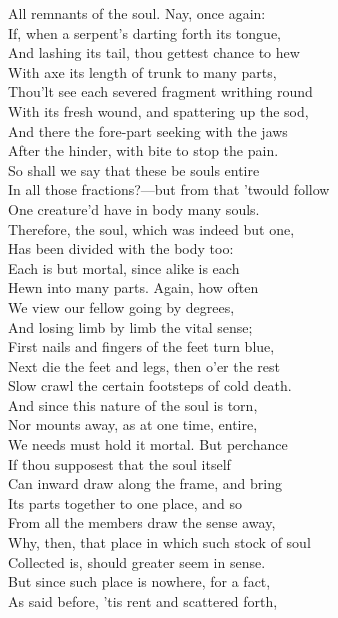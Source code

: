 All remnants of the soul. Nay, once again:\\
If, when a serpent's darting forth its tongue,\\
And lashing its tail, thou gettest chance to hew\\
With axe its length of trunk to many parts,\\
Thou'lt see each severed fragment writhing round\\
With its fresh wound, and spattering up the sod,\\
And there the fore-part seeking with the jaws\\
After the hinder, with bite to stop the pain.\\
So shall we say that these be souls entire\\
In all those fractions?—but from that 'twould follow\\
One creature'd have in body many souls.\\
Therefore, the soul, which was indeed but one,\\
Has been divided with the body too:\\
Each is but mortal, since alike is each\\
Hewn into many parts. Again, how often\\
We view our fellow going by degrees,\\
And losing limb by limb the vital sense;\\
First nails and fingers of the feet turn blue,\\
Next die the feet and legs, then o'er the rest\\
Slow crawl the certain footsteps of cold death.\\
And since this nature of the soul is torn,\\
Nor mounts away, as at one time, entire,\\
We needs must hold it mortal. But perchance\\
If thou supposest that the soul itself\\
Can inward draw along the frame, and bring\\
Its parts together to one place, and so\\
From all the members draw the sense away,\\
Why, then, that place in which such stock of soul\\
Collected is, should greater seem in sense.\\
But since such place is nowhere, for a fact,\\
As said before, 'tis rent and scattered forth,\\
